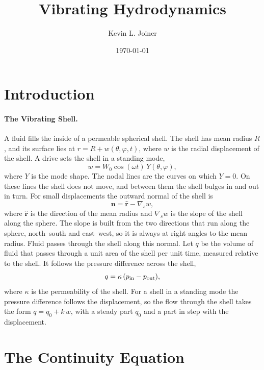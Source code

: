 \documentclass[12pt]{article}
\begin{document}
\title{Vibrating Hydrodynamics}
\date{\today}
\author{Kevin L. Joiner}

\maketitle

\section*{Introduction}

\paragraph{The Vibrating Shell.} A fluid fills the inside of a permeable spherical shell. The shell has mean radius $R$, and its surface lies at $r = R + w(\theta,\varphi,t)$, where $w$ is the radial displacement of the shell. A drive sets the shell in a standing mode,
%
\begin{equation}
w = W_0\cos(\omega t)\, Y(\theta,\varphi),
\label{eq:mode}
\end{equation}
%
where $Y$ is the mode shape. The nodal lines are the curves on which $Y = 0$. On these lines the shell does not move, and between them the shell bulges in and out in turn. For small displacements the outward normal of the shell is
%
\begin{equation}
\bm{n} = \hat{\bm r} - \nabla_s w,
\label{eq:normal}
\end{equation}
%
where $\hat{\bm r}$ is the direction of the mean radius and $\nabla_s w$ is the slope of the shell along the sphere. The slope is built from the two directions that run along the sphere, north--south and east--west, so it is always at right angles to the mean radius. Fluid passes through the shell along this normal. Let $q$ be the volume of fluid that passes through a unit area of the shell per unit time, measured relative to the shell. It follows the pressure difference across the shell,
%
\begin{equation}
q = \kappa\,(p_{\rm in} - p_{\rm out}),
\label{eq:permeation}
\end{equation}
%
where $\kappa$ is the permeability of the shell. For a shell in a standing mode the pressure difference follows the displacement, so the flow through the shell takes the form $q = q_0 + k\,w$, with a steady part $q_0$ and a part in step with the displacement.

\section*{The Continuity Equation}
\end{document}
